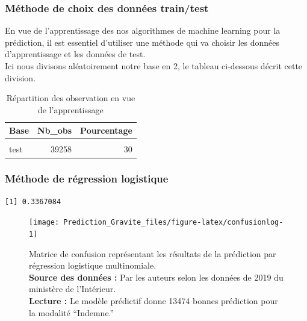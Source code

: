 \documentclass[french,]{tp}
\begin{document}
\hypertarget{div-train-test}{%
\subsubsection{Méthode de choix des données train/test}\label{div-train-test}}

En vue de l'apprentissage des nos algorithmes de machine learning pour la prédiction, il est essentiel d'utiliser une méthode qui va choisir les données d'apprentissage et les données de test.\\
Ici nous divisons aléatoirement notre base en 2, le tableau ci-dessous décrit cette division.



\begin{table}[H]

\caption{\label{tab:tabletraintest}Répartition des observation en vue de l'apprentissage}
\centering
\begin{tabular}[t]{lrr}
\toprule
\textbf{Base} & \textbf{Nb\_obs} & \textbf{Pourcentage}\\
\midrule
\cellcolor{gray!6}{train} & \cellcolor{gray!6}{91599} & \cellcolor{gray!6}{70}\\
test & 39258 & 30\\
\bottomrule
\end{tabular}
\end{table}

\newpage

\hypertarget{reg-log}{%
\subsubsection{Méthode de régression logistique}\label{reg-log}}

\begin{verbatim}
[1] 0.3367084
\end{verbatim}

\begin{figure}[ht!]

{\centering \texttt{[image: Prediction\_Gravite\_files/figure-latex/confusionlog-1]} 

}

\caption{Matrice de confusion représentant les résultats de la prédiction par régression logistique multinomiale.\\
\textbf{Source des données :} Par les auteurs selon les données de 2019 du ministère de l'Intérieur.\\
\textbf{Lecture :} Le modèle prédictif donne 13474 bonnes prédiction pour la modalité ``Indemne.''}\label{fig:confusionlog}
\end{figure}
\end{document}
